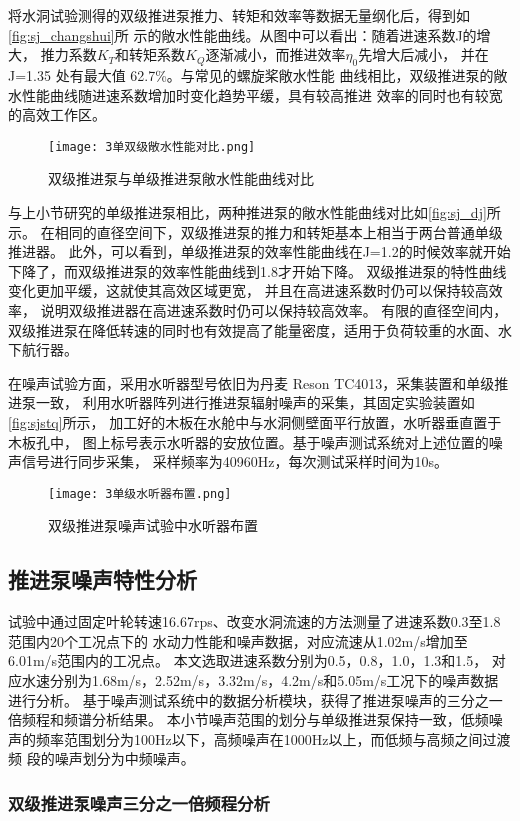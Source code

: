 将水洞试验测得的双级推进泵推力、转矩和效率等数据无量纲化后，得到如\autoref{fig:sj_changshui}所
示的敞水性能曲线。从图中可以看出：随着进速系数J的增大，
推力系数$K_T$和转矩系数$K_Q$逐渐减小，而推进效率$\eta_0$先增大后减小，
并在 J=1.35 处有最大值 62.7\%。与常见的螺旋桨敞水性能
曲线相比，双级推进泵的敞水性能曲线随进速系数增加时变化趋势平缓，具有较高推进
效率的同时也有较宽的高效工作区。
\begin{figure}[htbp]
    \centering
    \texttt{[image: 3单双级敞水性能对比.png]}
    \caption{\label{fig:sj_dj}双级推进泵与单级推进泵敞水性能曲线对比}
\end{figure}

与上小节研究的单级推进泵相比，两种推进泵的敞水性能曲线对比如\autoref{fig:sj_dj}所示。
在相同的直径空间下，双级推进泵的推力和转矩基本上相当于两台普通单级推进器。
此外，可以看到，单级推进泵的效率性能曲线在J=1.2的时候效率就开始下降了，而双级推进泵的效率性能曲线到1.8才开始下降。
双级推进泵的特性曲线变化更加平缓，这就使其高效区域更宽，
并且在高进速系数时仍可以保持较高效率，
说明双级推进器在高进速系数时仍可以保持较高效率。
有限的直径空间内，双级推进泵在降低转速的同时也有效提高了能量密度，适用于负荷较重的水面、水下航行器。

在噪声试验方面，采用水听器型号依旧为丹麦 Reson TC4013，采集装置和单级推进泵一致，
利用水听器阵列进行推进泵辐射噪声的采集，其固定实验装置如\autoref{fig:sjstq}所示，
加工好的木板在水舱中与水洞侧壁面平行放置，水听器垂直置于木板孔中，
图上标号表示水听器的安放位置。基于噪声测试系统对上述位置的噪声信号进行同步采集，
采样频率为40960Hz，每次测试采样时间为10s。
\begin{figure}[htbp]
    \centering
    \texttt{[image: 3单级水听器布置.png]}
    \caption{\label{fig:sjstq}双级推进泵噪声试验中水听器布置}
\end{figure}
\subsection{推进泵噪声特性分析}
试验中通过固定叶轮转速16.67rps、改变水洞流速的方法测量了进速系数0.3至1.8范围内20个工况点下的
水动力性能和噪声数据，对应流速从1.02m/s增加至6.01m/s范围内的工况点。
本文选取进速系数分别为0.5，0.8，1.0，1.3和1.5，
对应水速分别为1.68m/s，2.52m/s，3.32m/s，4.2m/s和5.05m/s工况下的噪声数据进行分析。
基于噪声测试系统中的数据分析模块，获得了推进泵噪声的三分之一倍频程和频谱分析结果。
本小节噪声范围的划分与单级推进泵保持一致，低频噪声的频率范围划分为100Hz以下，高频噪声在1000Hz以上，而低频与高频之间过渡频
段的噪声划分为中频噪声。
\subsubsection{双级推进泵噪声三分之一倍频程分析}

